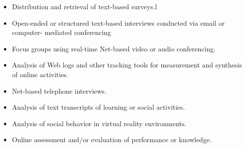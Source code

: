 \documentclass [10pt,a4paper]{book}
\begin{document}
\begin{itemize}
\item
Distribution and retrieval of text-based surveys.l
\item
Open-ended or structured text-based interviews conducted via email or computer-
mediated conferencing
\item
Focus groups using real-time Net-based video or audio conferencing.
\item
Analysis of Web logs and other tracking tools for measurement and synthesis of
online activities.
\item
Net-based telephone interviews.
\item
Analysis of text transcripts of learning or social activities.
\item
Analysis of social behavior in virtual reality environments.
\item
Online assessment and/or evaluation of performance or knowledge.
\end{itemize}
\end{document}
